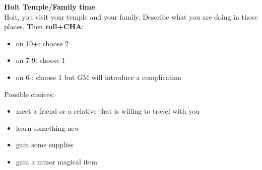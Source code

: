 {\noindent \bfseries Holt Temple/Family time}
\\
Holt, you visit your temple and your family. Describe what you are doing in those places. Then \textbf{roll+CHA}:
\begin{itemize}
	\item on 10+: choose 2
	\item on 7-9: choose 1
	\item on 6-: choose 1 but GM will introduce a complication
\end{itemize}

\simpleline

Possible choices:
\begin{itemize}
	\item meet a friend or a relative that is willing to travel with you
	\item learn something new
	\item gain some supplies
	\item gain a minor magical item
\end{itemize}